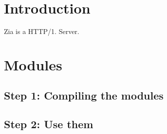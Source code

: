 \hypertarget{index_intro_sec}{}\section{Introduction}\label{index_intro_sec}
Zia is a H\+T\+T\+P/1. Server.\hypertarget{index_modules_sec}{}\section{Modules}\label{index_modules_sec}
\hypertarget{index_step1}{}\subsection{Step 1\+: Compiling the modules}\label{index_step1}
\hypertarget{index_step2}{}\subsection{Step 2\+: Use them}\label{index_step2}
